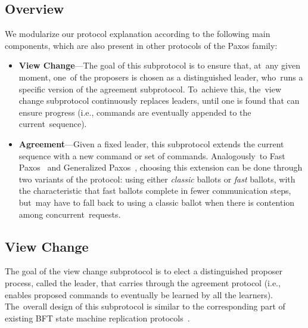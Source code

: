 \documentclass[algorithms,article,accept,moreauthors,pdftex,10pt,a4paper]{Definitions/mdpi}
\begin{document}
\subsection{Overview}
We modularize our protocol explanation according to the following main components, which are also present in other protocols of the Paxos family:

\begin{itemize}
\item
{\bf View Change}---The goal of this subprotocol is to ensure that, at~any given moment, one~of the proposers is chosen as a distinguished leader, who~runs a specific version of the agreement subprotocol. To~achieve this, the~view change subprotocol continuously replaces leaders, until one is found that can ensure progress (i.e., commands are eventually appended to the current~sequence).
\item
{\bf Agreement}---Given a fixed leader, this subprotocol extends the current sequence with a new command or set of commands. Analogously~to Fast Paxos~\cite{L06} and Generalized Paxos~\cite{Lamport2005}, choosing this extension can be done through two variants of the protocol: using either \textit{classic} ballots or \textit{fast} ballots, with the characteristic that fast ballots complete in fewer communication steps, but~may have to fall back to using a classic ballot when there is contention among concurrent~requests.
\end{itemize}

\subsection{View Change} 

The goal of the view change subprotocol is to elect a distinguished proposer process, called the leader, that carries through the agreement protocol (i.e., enables proposed commands to eventually be learned by all the learners). The~overall design of this subprotocol is similar to the corresponding part of existing BFT state machine replication protocols~\cite{CL99}.\par
\end{document}
